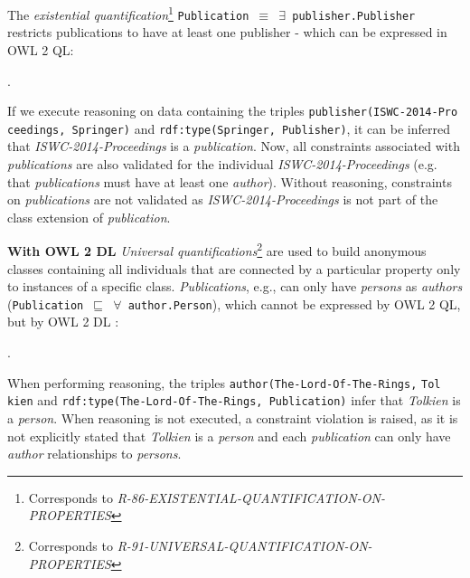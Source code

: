 \documentclass{llncs}
\newcommand{\ms}[1]{\texttt{#1}}
\begin{document}
The {\em existential quantification}\footnote{Corresponds to {\em R-86-EXISTENTIAL-QUANTIFICATION-ON-PROPERTIES}}
\ms{Publication $\equiv$ $\exists$ publisher.Publisher} restricts publications to have at least one publisher - which can be expressed in OWL 2 QL:
\begin{ex}
 .
\end{ex}
If we execute reasoning on data containing the triples \ms{publisher(ISWC-2014-Pro} \ms{ceedings, Springer)} and \ms{rdf:type(Springer, Publisher)}, 
it can be inferred that {\em ISWC-2014-Proceedings} is a {\em publication}.
Now, all constraints associated with {\em publications} are also validated for the individual {\em ISWC-2014-Proceedings} (e.g. that \emph{publications} must have at least one \emph{author}).
Without reasoning, constraints on {\em publications} are not validated as {\em ISWC-2014-Proceedings} is not part of the class extension of {\em publication}.

%
%

\textbf{With OWL 2 DL}
{\em Universal quantifications}\footnote{Corresponds to {\em R-91-UNIVERSAL-QUANTIFICATION-ON-PROPERTIES}}
are used to build anonymous classes containing all individuals that are connected by a particular property only to instances of a specific class.
\emph{Publications}, e.g., can only have \emph{persons} as \emph{authors} (\ms{Publication $\sqsubseteq$ $\forall$ author.Person}), 
which cannot be expressed by OWL 2 QL, but by OWL 2 DL \cite{owl2profiles2008}:
\begin{ex}
 .
\end{ex}
When performing reasoning, the triples \ms{author(The-Lord-Of-The-Rings,} \ms{Tol} \ms{kien} and \ms{rdf:type(The-Lord-Of-The-Rings, Publication)} infer that \emph{Tolkien} is a \emph{person}.
When reasoning is not executed, a constraint violation is raised, 
as it is not explicitly stated that \emph{Tolkien} is a \emph{person} and
each \emph{publication} can only have \emph{author} relationships to \emph{persons}.
\end{document}
